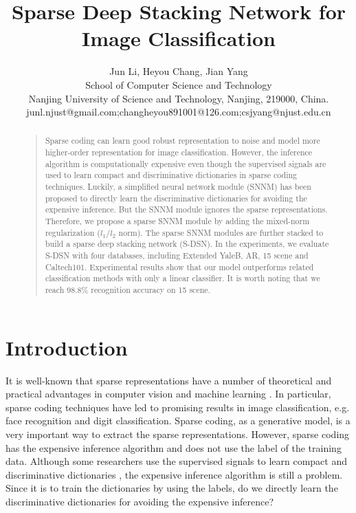 \documentclass[letterpaper]{article}
\begin{document}
\title{Sparse Deep Stacking Network for Image Classification}
\author{Jun Li, Heyou Chang, Jian Yang\\
School of Computer Science and Technology \\
Nanjing University of Science and Technology, Nanjing, 219000, China.\\
junl.njust@gmail.com;changheyou891001@126.com;csjyang@njust.edu.cn\\
}
\maketitle
\begin{abstract}
\begin{quote}
Sparse coding can learn good robust representation to noise and model more higher-order representation for image classification. However, the inference algorithm is computationally expensive even though the supervised signals are used to learn compact and discriminative dictionaries in sparse coding techniques. Luckily, a simplified neural network module (SNNM) has been proposed to directly learn the discriminative dictionaries for avoiding the expensive inference. But the SNNM module ignores the sparse representations. Therefore, we propose a sparse SNNM module by adding the mixed-norm regularization ($l_1/l_2$ norm). The sparse SNNM modules are further stacked to build a sparse deep stacking network (S-DSN). In the experiments, we evaluate S-DSN with four databases, including Extended YaleB, AR, 15 scene and Caltech101. Experimental results show that our model outperforms related classification methods with only a linear classifier. It is worth noting that we reach $98.8\%$ recognition accuracy on 15 scene.
\end{quote}
\end{abstract}

\section{Introduction}
It is well-known that sparse representations have a number of theoretical and practical advantages in computer vision and machine learning \cite{Lee2007,Gregor2010,Yang2012}. In particular, sparse coding techniques have led to promising results in image classification, e.g. face recognition and digit classification. Sparse coding, as a generative model, is a very important way to extract the sparse representations. However, sparse coding has the expensive inference algorithm and does not use the label of the training data. Although some researchers use the supervised signals to learn compact and discriminative dictionaries \cite{Jiang2013,Zhuang2013,Huang2013}, the expensive inference algorithm is still a problem. Since it is to train the dictionaries by using the labels, do we directly learn the discriminative dictionaries for avoiding the expensive inference?
\end{document}
